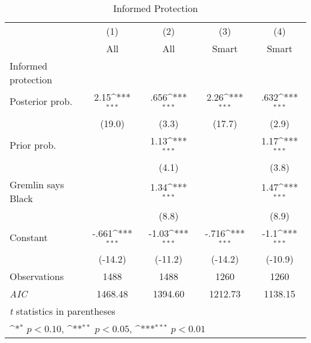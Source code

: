 \begin{table}[htbp]\centering
\def\sym#1{\ifmmode^{#1}\else\(^{#1}\)\fi}
\caption{Informed Protection}
\begin{tabular}{l*{4}{c}}
\hline\hline
                &\multicolumn{1}{c}{(1)}&\multicolumn{1}{c}{(2)}&\multicolumn{1}{c}{(3)}&\multicolumn{1}{c}{(4)}\\
                &\multicolumn{1}{c}{All}&\multicolumn{1}{c}{All}&\multicolumn{1}{c}{Smart}&\multicolumn{1}{c}{Smart}\\
\hline
Informed protection&                  &                  &                  &                  \\
Posterior prob. &     2.15\sym{***}&     .656\sym{***}&     2.26\sym{***}&     .632\sym{***}\\
                &   (19.0)         &    (3.3)         &   (17.7)         &    (2.9)         \\
Prior prob.     &                  &     1.13\sym{***}&                  &     1.17\sym{***}\\
                &                  &    (4.1)         &                  &    (3.8)         \\
Gremlin says Black&                  &     1.34\sym{***}&                  &     1.47\sym{***}\\
                &                  &    (8.8)         &                  &    (8.9)         \\
Constant        &    -.661\sym{***}&    -1.03\sym{***}&    -.716\sym{***}&     -1.1\sym{***}\\
                &  (-14.2)         &  (-11.2)         &  (-14.2)         &  (-10.9)         \\
\hline
Observations    &     1488         &     1488         &     1260         &     1260         \\
\textit{AIC}    &  1468.48         &  1394.60         &  1212.73         &  1138.15         \\
\hline\hline
\multicolumn{5}{l}{\footnotesize \textit{t} statistics in parentheses}\\
\multicolumn{5}{l}{\footnotesize \sym{*} \(p<0.10\), \sym{**} \(p<0.05\), \sym{***} \(p<0.01\)}\\
\end{tabular}
\end{table}
